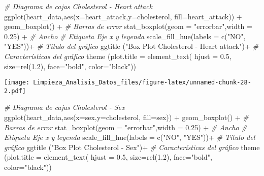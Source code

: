 \documentclass[
]{article}
\newenvironment{Shaded}{\begin{snugshade}}{\end{snugshade}}
\newcommand{\AttributeTok}[1]{\textcolor[rgb]{0.77,0.63,0.00}{#1}}
\newcommand{\CommentTok}[1]{\textcolor[rgb]{0.56,0.35,0.01}{\textit{#1}}}
\newcommand{\FloatTok}[1]{\textcolor[rgb]{0.00,0.00,0.81}{#1}}
\newcommand{\FunctionTok}[1]{\textcolor[rgb]{0.00,0.00,0.00}{#1}}
\newcommand{\NormalTok}[1]{#1}
\newcommand{\SpecialCharTok}[1]{\textcolor[rgb]{0.00,0.00,0.00}{#1}}
\newcommand{\StringTok}[1]{\textcolor[rgb]{0.31,0.60,0.02}{#1}}
\begin{document}
\begin{Shaded}
\begin{Highlighting}[]
\CommentTok{\# Diagrama de cajas Cholesterol {-} Heart attack}
\FunctionTok{ggplot}\NormalTok{(heart\_data,}\FunctionTok{aes}\NormalTok{(}\AttributeTok{x=}\NormalTok{heart\_attack,}\AttributeTok{y=}\NormalTok{cholesterol, }\AttributeTok{fill=}\NormalTok{heart\_attack)) }\SpecialCharTok{+}
  \FunctionTok{geom\_boxplot}\NormalTok{() }\SpecialCharTok{+}
  \CommentTok{\# Barras de error}
  \FunctionTok{stat\_boxplot}\NormalTok{(}\AttributeTok{geom =} \StringTok{"errorbar"}\NormalTok{,}\AttributeTok{width =} \FloatTok{0.25}\NormalTok{) }\SpecialCharTok{+} \CommentTok{\# Ancho}
  \CommentTok{\# Etiqueta Eje x y leyenda}
  \FunctionTok{scale\_fill\_hue}\NormalTok{(}\AttributeTok{labels =} \FunctionTok{c}\NormalTok{(}\StringTok{"NO"}\NormalTok{, }\StringTok{"YES"}\NormalTok{))}\SpecialCharTok{+}
  \CommentTok{\# Título del gráfico}
  \FunctionTok{ggtitle}\NormalTok{ (}\StringTok{"Box Plot Cholesterol {-} Heart attack"}\NormalTok{)}\SpecialCharTok{+}
  \CommentTok{\# Características del gráfico}
    \FunctionTok{theme}\NormalTok{ (}\AttributeTok{plot.title =} \FunctionTok{element\_text}\NormalTok{(}
        \AttributeTok{hjust =} \FloatTok{0.5}\NormalTok{,}
        \AttributeTok{size=}\FunctionTok{rel}\NormalTok{(}\FloatTok{1.2}\NormalTok{),}
        \AttributeTok{face=}\StringTok{"bold"}\NormalTok{, }
        \AttributeTok{color=}\StringTok{"black"}\NormalTok{))}
\end{Highlighting}
\end{Shaded}

\texttt{[image: Limpieza\_Analisis\_Datos\_files/figure-latex/unnamed-chunk-28-2.pdf]}

\begin{Shaded}
\begin{Highlighting}[]
\CommentTok{\# Diagrama de cajas Cholesterol {-} Sex}
\FunctionTok{ggplot}\NormalTok{(heart\_data,}\FunctionTok{aes}\NormalTok{(}\AttributeTok{x=}\NormalTok{sex,}\AttributeTok{y=}\NormalTok{cholesterol, }\AttributeTok{fill=}\NormalTok{sex)) }\SpecialCharTok{+}
  \FunctionTok{geom\_boxplot}\NormalTok{() }\SpecialCharTok{+}
  \CommentTok{\# Barras de error}
  \FunctionTok{stat\_boxplot}\NormalTok{(}\AttributeTok{geom =} \StringTok{"errorbar"}\NormalTok{,}\AttributeTok{width =} \FloatTok{0.25}\NormalTok{) }\SpecialCharTok{+} \CommentTok{\# Ancho}
  \CommentTok{\# Etiqueta Eje x y leyenda}
  \FunctionTok{scale\_fill\_hue}\NormalTok{(}\AttributeTok{labels =} \FunctionTok{c}\NormalTok{(}\StringTok{"NO"}\NormalTok{, }\StringTok{"YES"}\NormalTok{))}\SpecialCharTok{+}
  \CommentTok{\# Título del gráfico}
  \FunctionTok{ggtitle}\NormalTok{ (}\StringTok{"Box Plot Cholesterol {-} Sex"}\NormalTok{)}\SpecialCharTok{+}
  \CommentTok{\# Características del gráfico}
    \FunctionTok{theme}\NormalTok{ (}\AttributeTok{plot.title =} \FunctionTok{element\_text}\NormalTok{(}
        \AttributeTok{hjust =} \FloatTok{0.5}\NormalTok{,}
        \AttributeTok{size=}\FunctionTok{rel}\NormalTok{(}\FloatTok{1.2}\NormalTok{),}
        \AttributeTok{face=}\StringTok{"bold"}\NormalTok{, }
        \AttributeTok{color=}\StringTok{"black"}\NormalTok{))}
\end{Highlighting}
\end{Shaded}
\end{document}
